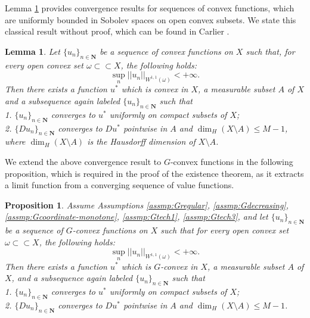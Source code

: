 \documentclass[a4paper, 11pt]{amsart}
\numberwithin{equation}{section}
\theoremstyle{plain}
\newtheorem{lemma}[theorem]{Lemma}
\newtheorem{proposition}[theorem]{Proposition}
\theoremstyle{definition}
\theoremstyle{remark}
\newcommand{\N}{\mathbf{N}}
\begin{document}
Lemma \ref{lemma1} provides convergence results for sequences of convex functions, which are uniformly bounded in Sobolev spaces on open convex subsets. We state this classical result without proof, which can be found in Carlier \cite{Carlier01}.\medskip


\begin{lemma}\label{lemma1}
	Let $\{u_n\}_{n\in \N}$ be a sequence of convex functions on $X$ such that, for every open convex set $\omega \subset \subset X$, the following holds:
	\begin{equation*}
	\sup\limits_{n} ||u_n||_{W^{1,1}(\omega)} < +\infty.
	\end{equation*}
	Then there exists a function $u^*$ %
	which is convex in $X$, a measurable subset $A$ of $X$ and a subsequence again labeled $\{u_n\}_{n\in \N}$ such that\\
	1. $\{u_n\}_{n\in \N}$ converges to $u^*$ uniformly on compact subsets of $X$;\\
	2. $\{D u_n\}_{n\in \N}$ converges to $D u^*$ pointwise in $A$ and $\dim_{H}(X\setminus A)\le M-1$, where $\dim_{H}(X\setminus A)$ is the Hausdorff dimension of $X\setminus A$.
\end{lemma}

{We extend the above convergence result to $G$-convex functions in the following proposition, which is required in the proof of the existence theorem, as it extracts a limit function from a converging sequence of value functions.}

\begin{proposition}\label{proposition:convergence}
	Assume Assumptions \ref{assmp:Gregular}, \ref{assmp:Gdecreasing}, \ref{assmp:Gcoordinate-monotone}, \ref{assmp:Gtech1}, \ref{assmp:Gtech3}, and let $\{u_n\}_{n\in \N}$ be a sequence of $G$-convex functions on $X$ such that for every open convex set $\omega \subset \subset X$, the following holds:
	\begin{equation*}
	\sup\limits_{n} ||u_n||_{W^{1,1}(\omega )} < +\infty.
	\end{equation*}
	Then there exists a function $u^*$ which is  $G$-convex in $X$, a measurable subset $A$ of $X$, and a subsequence again labeled $\{u_n\}_{n\in \N}$ such that\\
	1. $\{u_n\}_{n\in \N}$ converges to $u^*$ uniformly on compact subsets of $X$;\\
	2. $\{D u_n\}_{n\in \N}$ converges to $D u^*$ pointwise in $A$ and $\dim_{H}(X\setminus A)\le M-1$.
\end{proposition}
\end{document}
